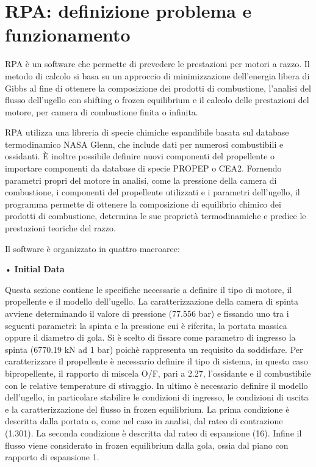 \section{RPA: definizione problema e funzionamento}
\label{appendix:rpa}

RPA è un software che permette di prevedere le prestazioni per motori a razzo. Il metodo di calcolo si basa su un approccio di minimizzazione dell'energia libera di Gibbs al fine di ottenere la composizione dei prodotti di combustione, l'analisi del flusso dell'ugello con shifting o frozen equilibrium e il calcolo delle prestazioni del motore, per camera di combustione finita o infinita.

RPA utilizza una libreria di specie chimiche espandibile basata sul database termodinamico NASA Glenn, che include dati per numerosi combustibili e ossidanti. È inoltre possibile definire nuovi componenti del propellente o importare componenti da database di specie PROPEP o CEA2.
Fornendo parametri propri del motore in analisi, come la pressione della camera di combustione, i componenti del propellente utilizzati e i parametri dell'ugello, il programma permette di ottenere la composizione di equilibrio chimico dei prodotti di combustione, determina le sue proprietà termodinamiche e predice le prestazioni teoriche del razzo. 

Il software è organizzato in quattro macroaree: 

• \textbf{Initial Data}

Questa sezione contiene le specifiche necessarie a definire il tipo di motore, il propellente e il modello dell'ugello.
La caratterizzazione della camera di spinta avviene determinando il valore di pressione (77.556 bar) e fissando uno tra i seguenti parametri: la spinta e la pressione cui è riferita, la portata massica oppure il diametro di gola. Si è scelto di fissare come parametro di ingresso la spinta (6770.19 kN ad 1 bar) poichè rappresenta un requisito da soddisfare.
Per caratterizzare il propellente è necessario definire il tipo di sistema, in questo caso bipropellente, il rapporto di miscela O/F, pari a 2.27, l'ossidante e il combustibile con le relative temperature di stivaggio. 
In ultimo è necessario definire il modello dell'ugello, in particolare stabilire le condizioni di ingresso, le condizioni di uscita e la caratterizzazione del flusso in frozen equilibrium. La prima condizione è descritta dalla portata o, come nel caso in analisi, dal rateo di contrazione (1.301). La seconda condizione è descritta dal rateo di espansione (16). Infine il flusso viene considerato in frozen equilibrium dalla gola, ossia dal piano con rapporto di espansione 1.

